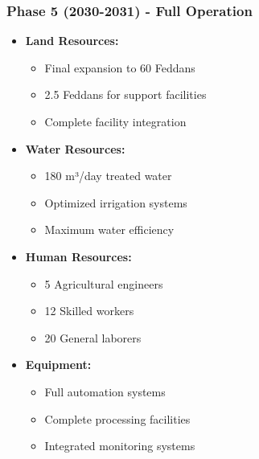 \subsubsection{Phase 5 (2030-2031) - Full Operation}
\begin{itemize}
    \item \textbf{Land Resources:}
    \begin{itemize}
        \item Final expansion to 60 Feddans
        \item 2.5 Feddans for support facilities
        \item Complete facility integration
    \end{itemize}
    \item \textbf{Water Resources:}
    \begin{itemize}
        \item 180 m³/day treated water
        \item Optimized irrigation systems
        \item Maximum water efficiency
    \end{itemize}
    \item \textbf{Human Resources:}
    \begin{itemize}
        \item 5 Agricultural engineers
        \item 12 Skilled workers
        \item 20 General laborers
    \end{itemize}
    \item \textbf{Equipment:}
    \begin{itemize}
        \item Full automation systems
        \item Complete processing facilities
        \item Integrated monitoring systems
    \end{itemize}
\end{itemize}

